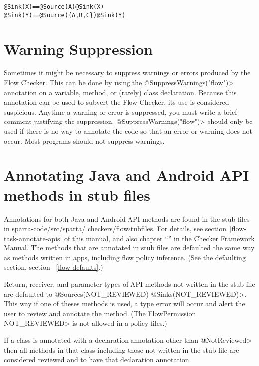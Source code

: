 \begin{alltt}
  @Sink(X)                   ==   @Source(A) @Sink(X)
  @Sink(Y)                   ==   @Source(\{A,B,C\}) @Sink(Y)
\end{alltt}


\section{Warning Suppression\label{sec:waringsuppression}}
 
Sometimes it might be necessary to suppress warnings or errors produced by
the Flow Checker.  This can be done by using the
\<@SuppressWarnings("flow")> annotation on a variable, method, or (rarely)
class declaration.  Because this annotation can be used to subvert the Flow
Checker, its use is considered suspicious.  Anytime a warning or error is
suppressed, you must write a brief comment justifying the suppression.
\<@SuppressWarnings("flow")> should only be used if there is no way to
annotate the code so that an error or warning does not occur.  Most
programs should not suppress warnings.


\section{Annotating Java and Android API methods in stub files\label{sec:apispecs}}

Annotations for both Java and Android API methods are found in the stub files in sparta-code/src/sparta/
checkers/flowstubfiles. 
For details, see section~\ref{flow-task-annotate-apis} of this manual, and also 
chapter
``'' in the Checker Framework Manual.  
 The methods that are annotated in stub files are defaulted the same way as methods written in apps, including flow policy inference.  (See the defaulting section, section ~\ref{flow-defaults}.) 

Return, receiver, and parameter types of API methods not written in the stub file are defaulted to \<@Sources(NOT\_REVIEWED) @Sinks(NOT\_REVIEWED)>.  This way if one of theses methods is used, a type error will occur and alert the user to review and annotate the method.  (The FlowPermission \<NOT\_REVIEWED> is not allowed in a policy files.)

If a class is annotated with a declaration annotation other than \<@NotReviewed>  then all methods in that class including those not written in the stub file are considered reviewed and to have that declaration annotation.  


